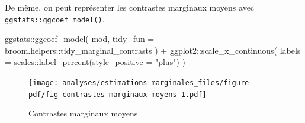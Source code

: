 \documentclass[
  letterpaper,
  DIV=11,
  numbers=noendperiod,
  oneside]{scrreprt}
\newenvironment{Shaded}{\begin{snugshade}}{\end{snugshade}}
\newcommand{\AttributeTok}[1]{\textcolor[rgb]{0.40,0.45,0.13}{#1}}
\newcommand{\FunctionTok}[1]{\textcolor[rgb]{0.28,0.35,0.67}{#1}}
\newcommand{\NormalTok}[1]{\textcolor[rgb]{0.00,0.23,0.31}{#1}}
\newcommand{\SpecialCharTok}[1]{\textcolor[rgb]{0.37,0.37,0.37}{#1}}
\newcommand{\StringTok}[1]{\textcolor[rgb]{0.13,0.47,0.30}{#1}}
\begin{document}
De même, on peut représenter les contrastes marginaux moyens avec
\texttt{ggstats::ggcoef\_model()}.

\begin{Shaded}
\begin{Highlighting}[]
\NormalTok{ggstats}\SpecialCharTok{::}\FunctionTok{ggcoef\_model}\NormalTok{(}
\NormalTok{  mod,}
  \AttributeTok{tidy\_fun =}\NormalTok{ broom.helpers}\SpecialCharTok{::}\NormalTok{tidy\_marginal\_contrasts}
\NormalTok{) }\SpecialCharTok{+}
\NormalTok{  ggplot2}\SpecialCharTok{::}\FunctionTok{scale\_x\_continuous}\NormalTok{(}
    \AttributeTok{labels =}\NormalTok{ scales}\SpecialCharTok{::}\FunctionTok{label\_percent}\NormalTok{(}\AttributeTok{style\_positive =} \StringTok{"plus"}\NormalTok{)}
\NormalTok{  )}
\end{Highlighting}
\end{Shaded}

\begin{figure}[H]

{\centering \texttt{[image: analyses/estimations-marginales\_files/figure-pdf/fig-contrastes-marginaux-moyens-1.pdf]}

}

\caption{\label{fig-contrastes-marginaux-moyens}Contrastes marginaux
moyens}

\end{figure}
\end{document}
